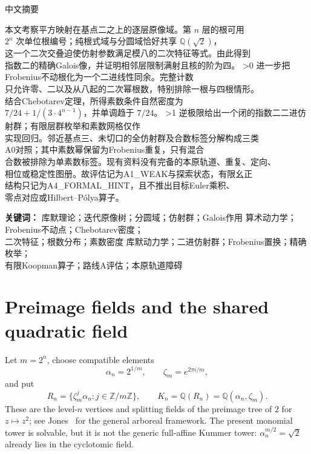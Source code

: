 \documentclass[10pt]{article}
\newcommand{\Q}{\mathbb Q}
\newcommand{\Z}{\mathbb Z}
\begin{document}
\begin{center}{\zhfont\large 中文摘要}\end{center}
{\zhfont
\begin{flushleft}
本文考察平方映射在基点二之上的逐层原像域。第 $n$ 层的根可用\\
$2^n$ 次单位根编号；纯根式域与分圆域恰好共享 $\Q(\sqrt2)$，\\
这一个二次交叠迫使仿射参数满足模八的二次特征等式。由此得到\\
指数二的精确{\normalfont Galois}像，并证明相邻层限制满射且核的阶为四。
\ifnum\CRevisionRound>0
进一步把{\normalfont Frobenius}不动根化为一个二进线性同余。完整计数\\
只允许零、二以及从八起的二次幂根数，特别排除一根与四根情形。\\
结合{\normalfont Chebotarev}定理，所得素数条件自然密度为\\
$7/24+1/(3\cdot4^{n-1})$，并单调趋于 $7/24$。
\fi
\ifnum\CRevisionRound>1
逆极限给出一个闭的指数二二进仿射群；有限层群枚举和素数网格仅作\\
实现回归。邻近基点三、未切口的全仿射群及合数标签分解构成三类\\
{\normalfont A0}对照；其中素数幂保留为{\normalfont Frobenius}重复，只有混合\\
合数被排除为单素数标签。现有资料没有完备的本原轨道、重复、定向、\\
相位或稳定性图册。故评估记为{\normalfont A1\_WEAK}与探索状态，有限幺正\\
结构只记为{\normalfont A4\_FORMAL\_HINT}，且不推出目标{\normalfont Euler}乘积、\\
零点对应或{\normalfont Hilbert--P\'olya}算子。
\fi

\textbf{关键词：}
\ifcase\CRevisionRound
库默理论；迭代原像树；分圆域；仿射群；{\normalfont Galois}作用
\or
算术动力学；{\normalfont Frobenius}不动点；{\normalfont Chebotarev}密度；\\
二次特征；根数分布；素数密度
\else
库默动力学；二进仿射群；{\normalfont Frobenius}置换；精确枚举；\\
有限{\normalfont Koopman}算子；路线{\normalfont A}评估；本原轨道障碍
\fi
\end{flushleft}
}

\section{Preimage fields and the shared quadratic field}
Let $m=2^n$, choose compatible elements
\[
 \alpha_n=2^{1/m},\qquad \zeta_m=e^{2\pi i/m},
\]
and put
\[
 R_n=\{\zeta_m^j\alpha_n:j\in\Z/m\Z\},\qquad
 K_n=\Q(R_n)=\Q(\alpha_n,\zeta_m).
\]
These are the level-$n$ vertices and splitting fields of the preimage tree
of $2$ for $z\mapsto z^2$; see Jones~\cite{Jones} for the general arboreal
framework.  The present monomial tower is solvable, but it is not the
generic full-affine Kummer tower: $\alpha_n^{m/2}=\sqrt2$ already lies in
the cyclotomic field.
\end{document}
